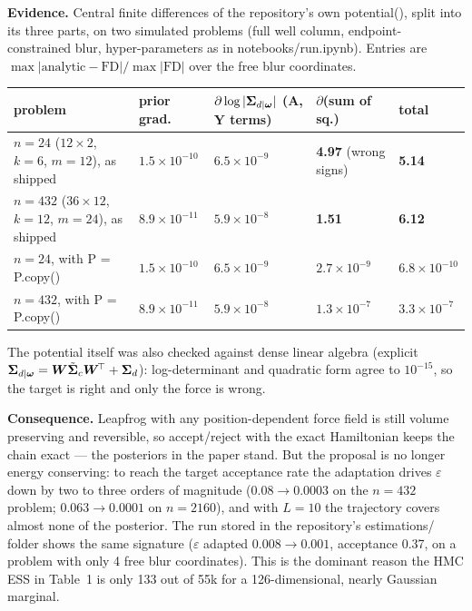 \documentclass[10pt]{article}
\newcommand{\bA}{\bm{A}}\newcommand{\bB}{\bm{B}}\newcommand{\bW}{\bm{W}}\newcommand{\bZ}{\bm{Z}}\newcommand{\bY}{\bm{Y}}
\newcommand{\bSig}{\bm{\Sigma}}\newcommand{\bLam}{\bm{\Lambda}}\newcommand{\bGam}{\bm{\Gamma}}
\newcommand{\Sd}{\bSig_{d|\bom}}
\newcommand{\Sct}{\tilde{\bSig}_c}
\newcommand{\eps}{\varepsilon}
\newcommand{\code}[1]{\begingroup\def\_{\char`\_\allowbreak}\ttfamily #1\endgroup}
\begin{document}
\textbf{Evidence.} Central finite differences of the repository's own \code{potential()}, split into its three parts, on two simulated problems (full well column, endpoint-constrained blur, hyper-parameters as in \code{notebooks/run.ipynb}). Entries are $\max|\text{analytic}-\text{FD}|/\max|\text{FD}|$ over the free blur coordinates.
\begin{center}\footnotesize
\begin{tabular}{@{}lllll@{}}\toprule
problem & prior grad. & $\partial\log|\Sd|$ ($\bA$, $\bY$ terms) & $\partial$(sum of sq.) & total\\\midrule
$n=24$ ($12\times2$, $k=6$, $m=12$), as shipped & $1.5\!\times\!10^{-10}$ & $6.5\!\times\!10^{-9}$ & \textbf{4.97} (wrong signs) & \textbf{5.14}\\
$n=432$ ($36\times12$, $k=12$, $m=24$), as shipped & $8.9\!\times\!10^{-11}$ & $5.9\!\times\!10^{-8}$ & \textbf{1.51} & \textbf{6.12}\\
$n=24$, with \code{P = P.copy()} & $1.5\!\times\!10^{-10}$ & $6.5\!\times\!10^{-9}$ & $2.7\!\times\!10^{-9}$ & $6.8\!\times\!10^{-10}$\\
$n=432$, with \code{P = P.copy()} & $8.9\!\times\!10^{-11}$ & $5.9\!\times\!10^{-8}$ & $1.3\!\times\!10^{-7}$ & $3.3\!\times\!10^{-7}$\\\bottomrule
\end{tabular}
\end{center}
The potential itself was also checked against dense linear algebra (explicit $\Sd=\bW\Sct\bW^{\!\top}+\bSig_d$): log-determinant and quadratic form agree to $10^{-15}$, so the target is right and only the force is wrong.

\textbf{Consequence.} Leapfrog with any position-dependent force field is still volume preserving and reversible, so accept/reject with the exact Hamiltonian keeps the chain exact --- the posteriors in the paper stand. But the proposal is no longer energy conserving: to reach the target acceptance rate the adaptation drives $\eps$ down by two to three orders of magnitude ($0.08\to0.0003$ on the $n=432$ problem; $0.063\to0.0001$ on $n=2160$), and with $L=10$ the trajectory covers almost none of the posterior. The run stored in the repository's \code{estimations/} folder shows the same signature ($\eps$ adapted $0.008\to0.001$, acceptance 0.37, on a problem with only 4 free blur coordinates). This is the dominant reason the HMC ESS in Table~1 is only 133 out of 55k for a 126-dimensional, nearly Gaussian marginal.
\end{document}
